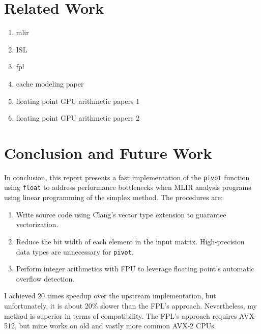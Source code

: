 \documentclass[logo,bsc,singlespacing,parskip]{infthesis}
\newcommand{\dtshort}{\texttt{int16\char`_t}}
\newcommand{\dtfloat}{\texttt{float}}
\newcommand{\pivot}{\texttt{pivot}}
\newenvironment{compactlist}
{ \begin{enumerate}
    \setlength{\itemsep}{0pt}
    \setlength{\parskip}{0pt}
    \setlength{\parsep}{0pt}     
}
{ \end{enumerate} }
\begin{document}

\chapter{Related Work}
\begin{enumerate}
    \item mlir
    \item ISL
    \item fpl
    \item cache modeling paper
    \item floating point GPU arithmetic papers 1
    \item floating point GPU arithmetic papers 2
\end{enumerate}

\chapter{Conclusion and Future Work}

In conclusion, this report presents a fast implementation of the \pivot{}
function using \dtfloat{} to address performance bottlenecks when MLIR analysis
programs using linear programming of the simplex method. The procedures are: 
\vspace*{-2.2mm}
\begin{compactlist}
    \item Write source code using Clang's vector type extension to guarantee
    vectorization.
    \item Reduce the bit width of each element in the input matrix.
    High-precision data types are unnecessary for \pivot{}.
    \item Perform integer arithmetics with FPU to leverage floating point's
    automatic overflow detection.
\end{compactlist}

I achieved 20 times speedup over the upstream implementation, but unfortunately,
it is about 20\% slower than the FPL's approach. Nevertheless, my method is
superior in terms of compatibility. The FPL's approach requires
AVX-512, but mine works on old and vastly more common AVX-2
CPUs.
\end{document}
